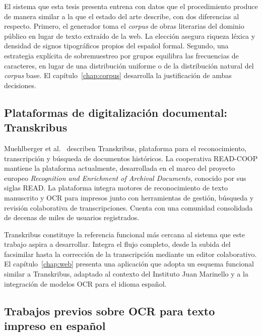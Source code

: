 El sistema que esta tesis presenta entrena con datos que el procedimiento produce de manera similar a la que el estado del arte describe, con dos diferencias al respecto. Primero, el generador toma el \textit{corpus} de obras literarias del dominio público en lugar de texto extraído de la web. La elección asegura riqueza léxica y densidad de signos tipográficos propios del español formal. Segundo, una estrategia explícita de sobremuestreo por grupos equilibra las frecuencias de caracteres, en lugar de una distribución uniforme o de la distribución natural del \textit{corpus} base. El capítulo~\ref{chap:corpus} desarrolla la justificación de ambas decisiones.

\subsection{Plataformas de digitalización documental: Transkribus}

Muehlberger et al.~\cite{muehlberger2019transkribus} describen Transkribus, plataforma para el reconocimiento, transcripción y búsqueda de documentos históricos. La cooperativa READ-COOP mantiene la plataforma actualmente, desarrollada en el marco del proyecto europeo \textit{Recognition and Enrichment of Archival Documents}, conocido por sus siglas READ. La plataforma integra motores de reconocimiento de texto manuscrito y OCR para impresos junto con herramientas de gestión, búsqueda y revisión colaborativa de transcripciones. Cuenta con una comunidad consolidada de decenas de miles de usuarios registrados.

Transkribus constituye la referencia funcional más cercana al sistema que este trabajo aspira a desarrollar. Integra el flujo completo, desde la subida del facsimilar hasta la corrección de la transcripción mediante un editor colaborativo. El capítulo~\ref{chap:web} presenta una aplicación que adopta un esquema funcional similar a Transkribus, adaptado al contexto del Instituto Juan Marinello y a la integración de modelos OCR para el idioma español.

\subsection{Trabajos previos sobre OCR para texto impreso en español}


